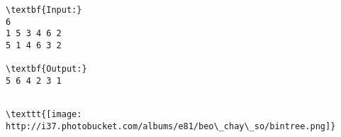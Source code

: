 \begin{verbatim}
\textbf{Input:}
6
1 5 3 4 6 2
5 1 4 6 3 2

\textbf{Output:}
5 6 4 2 3 1\end{verbatim}
\begin{verbatim}

\texttt{[image: http://i37.photobucket.com/albums/e81/beo\_chay\_so/bintree.png]}\end{verbatim}